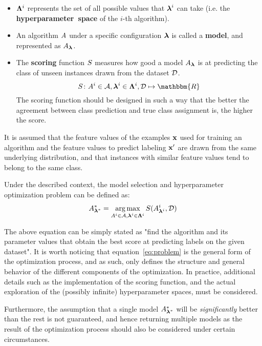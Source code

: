 \begin{itemize}
		\item
		$\mathbf{\Lambda}^i$ represents the set of all possible values that $\boldsymbol{\lambda}^i$ can take (i.e. the
		{\bf hyperparameter~space} of the $i$-th algorithm).

		\item
		An algorithm $A$ under a specific configuration $\boldsymbol{\lambda}$ is called a {\bf model}, and
		represented as $A_{\boldsymbol{\lambda}}$.

		\item
		The {\bf scoring} function $S$ measures how good a model $A_{\boldsymbol{\lambda}}$ is at
		predicting the class of unseen instances drawn from the dataset
		$\mathcal{D}$.
		\begin{equation}
			\Score \colon \algo^i \in \algoset, \param^i \in \paramspace^i, \alldata \mapsto
			\mathbbm{R}
		\end{equation}
		The scoring function should be designed in such a way that the better the agreement between
		class prediction and true class assignment is, the higher the score.
	\end{itemize}

	It is assumed that the feature values of the examples $\mathbf{x}$ used for training an algorithm
	and the feature values to predict labeling $\mathbf{x}'$ are drawn from the same underlying
	distribution, and that instances with similar feature values tend to belong to the same class.

	Under the described context, the model selection and hyperparameter optimization problem can be
	defined as:
	\begin{equation}
		\label{eq:problem}
		A^*_{\boldsymbol{\lambda}^*} = \operatorname*{arg\,max}_{A^i \in \mathcal{A}, \boldsymbol{\lambda}^i \in \mathbf{\Lambda}^i}
		S(A^i_{\boldsymbol{\lambda}^i}, \mathcal{D})
	\end{equation}

	The above equation can be simply stated as "find the algorithm and its parameter values that
	obtain the best score at predicting labels on the given dataset". It is worth noticing that
	equation~\ref{eq:problem} is the general form of the optimization process, and as such, only
	defines the structure and general behavior of the different components of the optimization. In
	practice, additional details such as the implementation of the scoring function, and the actual
	exploration of the (possibly infinite) hyperparameter spaces, must be considered.

	Furthermore, the assumption that a single model $A^*_{\boldsymbol{\lambda}^*}$ will be \emph{significantly} better than the
	rest is not guaranteed, and hence returning multiple models as the result of the
	optimization process should also be considered under certain circumstances.

